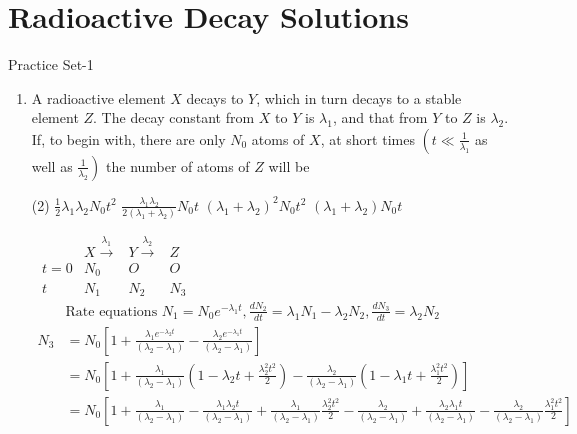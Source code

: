 \chapter{Radioactive Decay Solutions}
\begin{abox}
	Practice Set-1
\end{abox}
\begin{enumerate}
	\item  A radioactive element $X$ decays to $Y$, which in turn decays to a stable element $Z$. The decay constant from $X$ to $Y$ is $\lambda_1$, and that from $Y$ to $Z$ is $\lambda_2$. If, to begin with, there are only $N_0$ atoms of $X$, at short times $\left(t \ll \frac{1}{\lambda_1}\right.$ as well as $\left.\frac{1}{\lambda_2}\right)$ the number of atoms of $Z$ will be
	{}
	\begin{tasks}(2)
		\task[\textbf{a.}]$\frac{1}{2} \lambda_1 \lambda_2 N_0 t^2$
		\task[\textbf{b.}]$\frac{\lambda_1 \lambda_2}{2\left(\lambda_1+\lambda_2\right)} N_0 t$
		\task[\textbf{c.}]$\left(\lambda_1+\lambda_2\right)^2 N_0 t^2$
		\task[\textbf{d.}]$\left(\lambda_1+\lambda_2\right) N_0 t$
	\end{tasks}
	\begin{answer}$\left. \right. $
		$\begin{array}{llll}  
		&X \stackrel{\lambda_1}{\longrightarrow}  & Y \stackrel{\lambda_2}{\longrightarrow}&Z  \\ 
		t=0 & N_0 & O & O  \\ 
		t & N_1 & N_2 & N_3\end{array}$
		\begin{align*}
		&\text{Rate equations }N_1=N_0 e^{-\lambda_1 t}, \frac{d N_2}{d t}=\lambda_1 N_1-\lambda_2 N_2, \frac{d N_3}{d t}=\lambda_2 N_2\\
		N_3&=N_0\left[1+\frac{\lambda_1 e^{-\lambda_2 t}}{\left(\lambda_2-\lambda_1\right)}-\frac{\lambda_2 e^{-\lambda_1 t}}{\left(\lambda_2-\lambda_1\right)}\right] \\
		&=N_0\left[1+\frac{\lambda_1}{\left(\lambda_2-\lambda_1\right)}\left(1-\lambda_2 t+\frac{\lambda_2^2 t^2}{2}\right)-\frac{\lambda_2}{\left(\lambda_2-\lambda_1\right)}\left(1-\lambda_1 t+\frac{\lambda_1^2 t^2}{2}\right)\right] \\
		&=N_0\left[1+\frac{\lambda_1}{\left(\lambda_2-\lambda_1\right)}-\frac{\lambda_1 \lambda_2 t}{\left(\lambda_2-\lambda_1\right)}+\frac{\lambda_1}{\left(\lambda_2-\lambda_1\right)} \frac{\lambda_2^2 t^2}{2}-\frac{\lambda_2}{\left(\lambda_2-\lambda_1\right)}+\frac{\lambda_2 \lambda_1 t}{\left(\lambda_2-\lambda_1\right)}-\frac{\lambda_2}{\left(\lambda_2-\lambda_1\right)} \frac{\lambda_1^2 t^2}{2}\right] \\

\end{align*}
\end{answer}
\end{enumerate}
